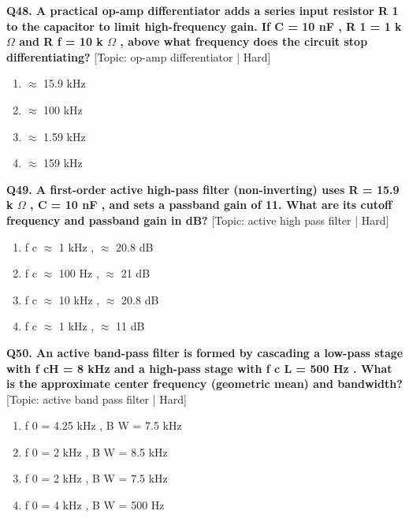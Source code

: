 \noindent\textbf{Q48. A practical op-amp differentiator adds a series input resistor R 1 to the capacitor to limit high-frequency gain. If C = 10 nF , R 1 = 1 k $\Omega$ and R f = 10 k $\Omega$ , above what frequency does the circuit stop differentiating?} \hfill [Topic: op-amp differentiator | Hard]
\begin{enumerate}[label=(\alph*),topsep=2pt,itemsep=1pt,partopsep=0pt,parsep=0pt]
    \item {$\approx$ 15.9 kHz}
    \item {$\approx$ 100 kHz}
    \item {$\approx$ 1.59 kHz}
    \item {$\approx$ 159 kHz}
\end{enumerate}
\vspace{2mm}

\noindent\textbf{Q49. A first-order active high-pass filter (non-inverting) uses R = 15.9 k $\Omega$ , C = 10 nF , and sets a passband gain of 11. What are its cutoff frequency and passband gain in dB?} \hfill [Topic: active high pass filter | Hard]
\begin{enumerate}[label=(\alph*),topsep=2pt,itemsep=1pt,partopsep=0pt,parsep=0pt]
    \item {f c $\approx$ 1 kHz , $\approx$ 20.8 dB}
    \item {f c $\approx$ 100 Hz , $\approx$ 21 dB}
    \item {f c $\approx$ 10 kHz , $\approx$ 20.8 dB}
    \item {f c $\approx$ 1 kHz , $\approx$ 11 dB}
\end{enumerate}
\vspace{2mm}

\noindent\textbf{Q50. An active band-pass filter is formed by cascading a low-pass stage with f cH = 8 kHz and a high-pass stage with f c L = 500 Hz . What is the approximate center frequency (geometric mean) and bandwidth?} \hfill [Topic: active band pass filter | Hard]
\begin{enumerate}[label=(\alph*),topsep=2pt,itemsep=1pt,partopsep=0pt,parsep=0pt]
    \item {f 0 = 4.25 kHz , B W = 7.5 kHz}
    \item {f 0 = 2 kHz , B W = 8.5 kHz}
    \item {f 0 = 2 kHz , B W = 7.5 kHz}
    \item {f 0 = 4 kHz , B W = 500 Hz}
\end{enumerate}
\vspace{2mm}

